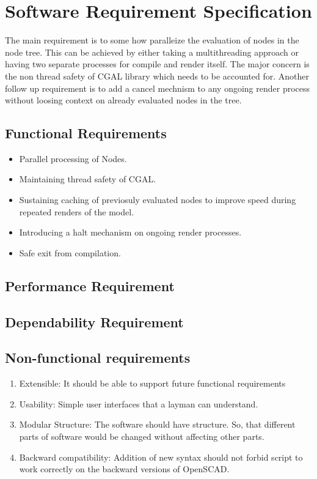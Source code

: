 \section{Software Requirement Specification}
The main requirement is to some how paralleize the evaluation of nodes in the node tree. This can be achieved by either taking a multithreading approach or having two separate processes for compile and render itself. The major concern is the non thread safety of CGAL library which needs to be accounted for.
Another follow up requirement is to add a cancel mechnism to any ongoing render process without loosing context on already evaluated nodes in the tree.

\subsection{Functional Requirements}
\begin{itemize}
	\item Parallel processing of Nodes.
	\item Maintaining thread safety of CGAL.
	\item Sustaining caching of previosuly evaluated nodes to improve speed during repeated renders of the model.
	\item Introducing a halt mechanism on ongoing render processes.
	\item Safe exit from compilation.
\end{itemize}

\subsection{Performance Requirement} 

\subsection{Dependability Requirement}

\subsection{Non-functional requirements}
\begin{enumerate}
	\item Extensible: It should be able to support future functional requirements
	\item Usability: Simple user interfaces that a layman can understand.
	\item Modular Structure: The software should have  structure. So, that different parts of software would be changed without affecting other parts.
	\item Backward compatibility: Addition of new syntax should not forbid script to work correctly on the backward versions of OpenSCAD.
\end{enumerate}

